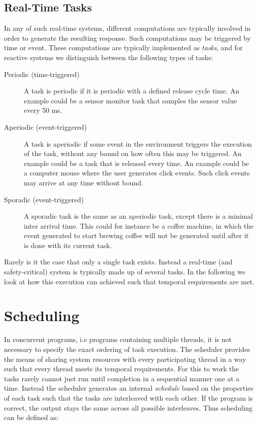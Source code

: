 \subsection{Real-Time Tasks} %
\label{sub:real_time_tasks}
In any of such real-time systems, different computations are typically involved in order to generate the resulting response. Such computations may be triggered by time or event. These computations are typically implemented as \textit{tasks}, and for reactive systems we distinguish between the following types of tasks:
\begin{description}
	\item[Periodic (time-triggered)] A task is periodic if it is periodic with a defined release cycle time. An example could be a sensor monitor task that samples the sensor value every 50 ms.
	\item[Aperiodic (event-triggered)] A task is aperiodic if some event in the environment triggers the execution of the task, without any bound on how often this may be triggered. An example could be a task that is released every time. An example could be a computer mouse where the user generates click events. Such click events may arrive at any time without bound.
	\item[Sporadic (event-triggered)] A sporadic task is the same as an aperiodic task, except there is a minimal inter arrival time. This could for instance be a coffee machine, in which the event generated to start brewing coffee will not be generated until after it is done with its current task.
\end{description}

Rarely is it the case that only a single task exists. Instead a real-time (and safety-critical) system is typically made up of several tasks. In the following we look at how this execution can achieved such that temporal requirements are met.


\section{Scheduling} %
\label{sec:scheduling}
In concurrent programs, i.e programs containing multiple threads, it is not necessary to specify the exact ordering of task execution. The scheduler provides the means of sharing system resources with every participating thread in a way such that every thread meets its temporal requirements. For this to work the tasks rarely cannot just run until completion in a sequential manner one at a time. Instead the scheduler generates an internal \textit{schedule} based on the properties of each task such that the tasks are interleaved with each other. If the program is correct, the output stays the same across all possible interleaves. Thus scheduling can be defined as:


